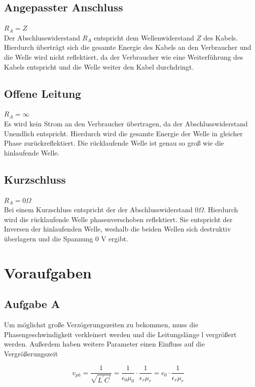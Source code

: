 \documentclass{article}
\begin{document}
\subsection*{Angepasster Anschluss}
$R_A = Z$\\
Der Abschlusswiderstand $R_A$ entspricht dem Wellenwiderstand $Z$ des Kabels. Hierdurch überträgt sich die gesamte Energie des Kabels an den Verbraucher und die Welle wird nicht reflektiert, da der Verbraucher wie eine Weiterführung des Kabels entspricht und die Welle weiter den Kabel durchdringt.


\subsection*{Offene Leitung}
$R_A = \infty$\\
Es wird kein Strom an den Verbraucher übertragen, da der Abschlusswiderstand Unendlich entspricht. Hierdurch wird die gesamte Energie der Welle in gleicher Phase zurückreflektiert. Die rücklaufende Welle ist genau so groß wie die hinlaufende Welle.



\subsection*{Kurzschluss }
$R_A= 0 \Omega$\\
Bei einem Kurzschluss entspricht der der Abschlusswiderstand $ 0 \Omega$. Hierdurch wird die rücklaufende Welle phasenverschoben reflektiert. Sie entspricht der Inversen der hinlaufenden Welle, weshalb die beiden Wellen sich destruktiv überlagern und die Spannung 0 V ergibt.

\section{Voraufgaben}

\subsection*{Aufgabe A}
Um möglichst große Verzögerungszeiten zu bekommen, muss die Phasengeschwindigkeit verkleinert werden und die Leitungslänge l vergrößert werden. Außerdem haben weitere Parameter einen Einfluss auf die Vergrößerungszeit

\begin{equation}
    v_{ph}= \frac{1}{\sqrt{L^{\prime}C^{\prime}}}= \frac{1}{\epsilon_0\mu_0}\cdot \frac{1}{\epsilon_r\mu_r} =c_0 \cdot \frac{1}{\epsilon_r\mu_r}
\end{equation}
\end{document}
